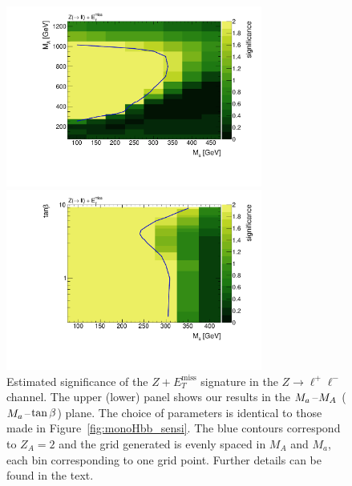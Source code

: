 \documentclass[review]{elsarticle}
\newcommand{\MET}{\ensuremath{E_T^\mathrm{miss}}\xspace}
\newcommand{\mA}{\ensuremath{M_{A}}\xspace}
\newcommand{\ma}{\ensuremath{M_{a}}\xspace}
\begin{document}
\begin{figure}[t!]
\centering
\includegraphics[width=0.75\textwidth]{MonoZ_Sensitivity_mAma_solid.pdf} 

\vspace{2mm}

\includegraphics[width=0.75\textwidth]{MonoZ_Sensitivity_tanbma_log_solid.pdf} 
\vspace{2mm}
\caption{Estimated significance of the $Z+\MET$ signature in the $Z \to \ell^+ \ell^-$ channel. The upper (lower) panel shows our results in the $\ma\hspace{0.25mm}$--$\hspace{0.25mm}\mA$ ($\ma\hspace{0.25mm}$--$\hspace{0.25mm}\tan \beta$) plane. The choice of parameters is identical to those made in Figure~\ref{fig:monoHbb_sensi}. The blue contours correspond to $Z_A = 2$ and the grid generated is evenly spaced in \mA and \ma, each bin corresponding to one grid point. Further details can be found in the text. }
\label{fig:monoZll_sensi}
\end{figure}
\end{document}

